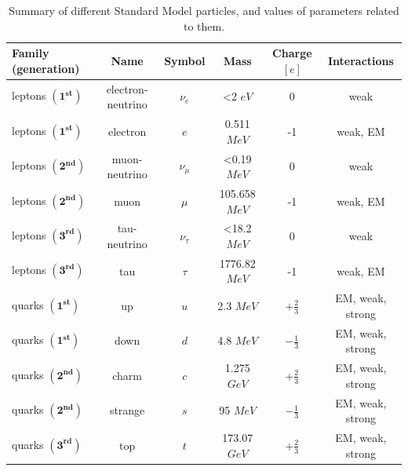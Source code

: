 \begin{table}[!h!tb]
        \begin{center}
                \small
                \caption{
			Summary of different Standard Model particles, and values of parameters related to them. %
                        \label{table:quarks_leptons}
                } %
                \begin{tabular}{|l|c|c|c|c|c|} \hline \hline
			\textbf{Family (generation)} & Name & Symbol & Mass  & Charge$[e]$ & Interactions \\ \hline \hline
			leptons $(\mathbf{1^{st}})$& electron-neutrino &  $\nu_{e}$ & <2 $eV$  & 0 & weak \\
			leptons $(\mathbf{1^{st}})$& electron &  $e$ & 0.511 $MeV$  & -1 & weak, EM \\
			leptons $(\mathbf{2^{nd}})$& muon-neutrino &  $\nu_{\mu}$ & <0.19 $MeV$  & 0 & weak \\
			leptons $(\mathbf{2^{nd}})$& muon &  $\mu$ & 105.658 $MeV$  & -1 & weak, EM \\
			leptons $(\mathbf{3^{rd}})$& tau-neutrino &  $\nu_{\tau}$ & <18.2 $MeV$  & 0 & weak \\
			leptons $(\mathbf{3^{rd}})$& tau &  $\tau$ & 1776.82 $MeV$  & -1 & weak, EM \\ \hline \hline
			quarks $(\mathbf{1^{st}})$& up &  $u$ & 2.3 $MeV$  & $+\frac{2}{3}$ & EM, weak, strong \\
			quarks $(\mathbf{1^{st}})$& down &  $d$ & 4.8 $MeV$  & $-\frac{1}{3}$ & EM, weak, strong \\
			quarks $(\mathbf{2^{nd}})$& charm &  $c$ & 1.275 $GeV$  & $+\frac{2}{3}$ & EM, weak, strong \\
			quarks $(\mathbf{2^{nd}})$& strange &  $s$ & 95 $MeV$  & $-\frac{1}{3}$ & EM, weak, strong \\
			quarks $(\mathbf{3^{rd}})$& top &  $t$ & 173.07 $GeV$  & $+\frac{2}{3}$ & EM, weak, strong \\

\end{tabular}
\end{center}
\end{table}
